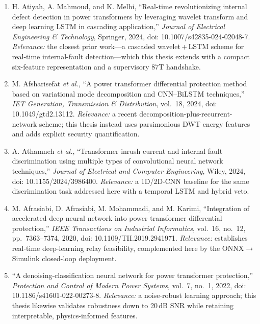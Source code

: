 \documentclass[12pt,a4paper,oneside]{report}
\begin{document}
\begin{enumerate}[leftmargin=1.6em,itemsep=6pt]
\item H. Atiyah, A. Mahmoud, and K. Melhi, ``Real-time revolutionizing internal defect detection in power transformers by leveraging wavelet transform and deep learning LSTM in cascading application,'' \textit{Journal of Electrical Engineering \& Technology}, Springer, 2024, doi: 10.1007/s42835-024-02048-7. \textit{Relevance:} the closest prior work---a cascaded wavelet\,+\,LSTM scheme for real-time internal-fault detection---which this thesis extends with a compact six-feature representation and a supervisory 87T handshake.
\item M. Afsharisefat \textit{et al.}, ``A power transformer differential protection method based on variational mode decomposition and CNN--BiLSTM techniques,'' \textit{IET Generation, Transmission \& Distribution}, vol.~18, 2024, doi: 10.1049/gtd2.13112. \textit{Relevance:} a recent decomposition-plus-recurrent-network scheme; this thesis instead uses parsimonious DWT energy features and adds explicit security quantification.
\item A. Athamneh \textit{et al.}, ``Transformer inrush current and internal fault discrimination using multiple types of convolutional neural network techniques,'' \textit{Journal of Electrical and Computer Engineering}, Wiley, 2024, doi: 10.1155/2024/3986400. \textit{Relevance:} a 1D/2D-CNN baseline for the same discrimination task addressed here with a temporal LSTM and hybrid veto.
\item M. Afrasiabi, D. Afrasiabi, M. Mohammadi, and M. Karimi, ``Integration of accelerated deep neural network into power transformer differential protection,'' \textit{IEEE Transactions on Industrial Informatics}, vol.~16, no.~12, pp.~7363--7374, 2020, doi: 10.1109/TII.2019.2941971. \textit{Relevance:} establishes real-time deep-learning relay feasibility, complemented here by the ONNX$\to$Simulink closed-loop deployment.
\item ``A denoising-classification neural network for power transformer protection,'' \textit{Protection and Control of Modern Power Systems}, vol.~7, no.~1, 2022, doi: 10.1186/s41601-022-00273-8. \textit{Relevance:} a noise-robust learning approach; this thesis likewise validates robustness down to 20\,dB SNR while retaining interpretable, physics-informed features.
\end{enumerate}
\end{document}
